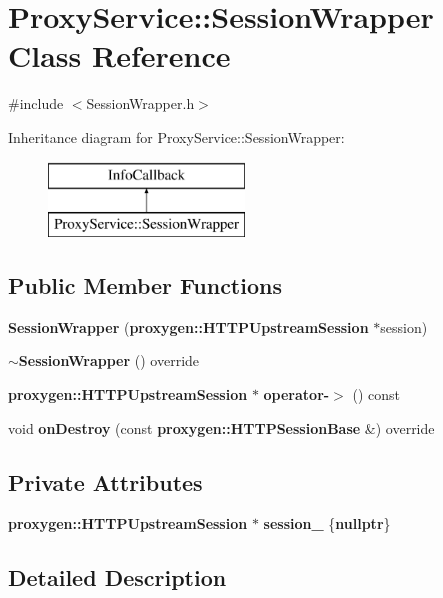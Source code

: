 \section{Proxy\+Service\+:\+:Session\+Wrapper Class Reference}
\label{classProxyService_1_1SessionWrapper}


{\ttfamily \#include $<$Session\+Wrapper.\+h$>$}

Inheritance diagram for Proxy\+Service\+:\+:Session\+Wrapper\+:\begin{figure}[H]
\begin{center}
\leavevmode
\includegraphics[height=2.000000cm]{classProxyService_1_1SessionWrapper}
\end{center}
\end{figure}
\subsection*{Public Member Functions}
\begin{DoxyCompactItemize}
\item 
{\bf Session\+Wrapper} ({\bf proxygen\+::\+H\+T\+T\+P\+Upstream\+Session} $\ast$session)
\item 
{\bf $\sim$\+Session\+Wrapper} () override
\item 
{\bf proxygen\+::\+H\+T\+T\+P\+Upstream\+Session} $\ast$ {\bf operator-\/$>$} () const 
\item 
void {\bf on\+Destroy} (const {\bf proxygen\+::\+H\+T\+T\+P\+Session\+Base} \&) override
\end{DoxyCompactItemize}
\subsection*{Private Attributes}
\begin{DoxyCompactItemize}
\item 
{\bf proxygen\+::\+H\+T\+T\+P\+Upstream\+Session} $\ast$ {\bf session\+\_\+} \{{\bf nullptr}\}
\end{DoxyCompactItemize}


\subsection{Detailed Description}


